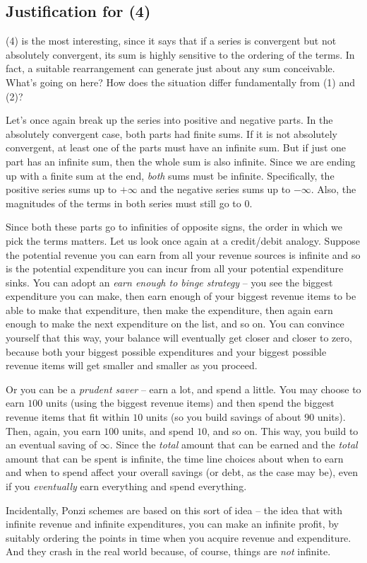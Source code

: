 \documentclass[10pt]{amsart}
\begin{document}
\subsection{Justification for (4)}

(4) is the most interesting, since it says that if a series is
convergent but not absolutely convergent, its sum is highly sensitive
to the ordering of the terms. In fact, a suitable rearrangement can
generate just about any sum conceivable. What's going on here? How
does the situation differ fundamentally from (1) and (2)?

Let's once again break up the series into positive and negative
parts. In the absolutely convergent case, both parts had finite
sums. If it is not absolutely convergent, at least one of the parts
must have an infinite sum. But if just one part has an infinite sum,
then the whole sum is also infinite. Since we are ending up with a
finite sum at the end, {\em both} sums must be infinite. Specifically,
the positive series sums up to $+\infty$ and the negative series sums
up to $-\infty$. Also, the magnitudes of the terms in both series must
still go to $0$.

Since both these parts go to infinities of opposite signs, the order
in which we pick the terms matters. Let us look once again at a
credit/debit analogy. Suppose the potential revenue you can earn from
all your revenue sources is infinite and so is the potential
expenditure you can incur from all your potential expenditure
sinks. You can adopt an {\em earn enough to binge strategy} -- you see
the biggest expenditure you can make, then earn enough of your biggest
revenue items to be able to make that expenditure, then make the
expenditure, then again earn enough to make the next expenditure on
the list, and so on. You can convince yourself that this way, your
balance will eventually get closer and closer to zero, because both
your biggest possible expenditures and your biggest possible revenue
items will get smaller and smaller as you proceed.

Or you can be a {\em prudent saver} -- earn a lot, and spend a
little. You may choose to earn $100$ units (using the biggest revenue
items) and then spend the biggest revenue items that fit within $10$
units (so you build savings of about $90$ units). Then, again, you
earn $100$ units, and spend $10$, and so on. This way, you build to an
eventual saving of $\infty$. Since the {\em total} amount that can be
earned and the {\em total} amount that can be spent is infinite, the
time line choices about when to earn and when to spend affect your
overall savings (or debt, as the case may be), even if you {\em
eventually} earn everything and spend everything.

Incidentally, Ponzi schemes are based on this sort of idea -- the idea
that with infinite revenue and infinite expenditures, you can make an
infinite profit, by suitably ordering the points in time when you
acquire revenue and expenditure. And they crash in the real world
because, of course, things are {\em not} infinite.
\end{document}
